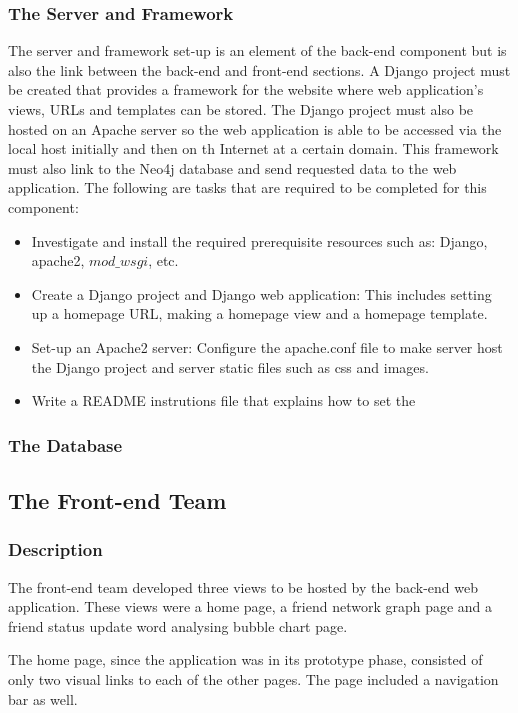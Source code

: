 \documentclass[10pt,onecolumn]{article}
\begin{document}
\subsubsection{The Server and Framework}
The server and framework set-up is an element of the back-end component but is also the link between the back-end and front-end sections. A Django project must be created that provides a framework for the website where web application's views, URLs and templates can be stored. The Django project must also be hosted on an Apache server so the web application is able to be accessed via the local host initially and then on th Internet at a certain domain. This framework must also link to the Neo4j database and send requested data to the web application. The following are tasks that are required to be completed for this component:

\begin{itemize}
	\item Investigate and install the required prerequisite resources such as: Django, apache2, $mod\_wsgi$, etc.
	\item Create a Django project and Django web application: This includes setting up a homepage URL, making a homepage view and a homepage template.
	\item Set-up an Apache2 server: Configure the apache.conf file to make server host the Django project and server static files such as css and images.
	\item Write a README instrutions file that explains how to set the   
\end{itemize}

\subsubsection{The Database}



\subsection{The Front-end Team}
\subsubsection{Description}
The front-end team developed three views to be hosted by the back-end web application. These views were a home page, a friend network graph page and a friend status update word analysing bubble chart page. 

The home page, since the application was in its prototype phase, consisted of only two visual links to each of the other pages. The page included a navigation bar as well. 
\end{document}
